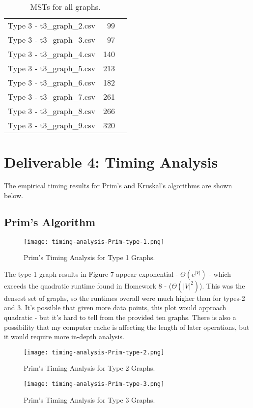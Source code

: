 \documentclass{article}
\begin{document}
\begin{table}[h!]
\begin{tabular}{lrr}
Type 3 - t3\_graph\_2.csv & 99 \\
Type 3 - t3\_graph\_3.csv & 97 \\
Type 3 - t3\_graph\_4.csv & 140 \\
Type 3 - t3\_graph\_5.csv & 213 \\
Type 3 - t3\_graph\_6.csv & 182 \\
Type 3 - t3\_graph\_7.csv & 261 \\
Type 3 - t3\_graph\_8.csv & 266 \\
Type 3 - t3\_graph\_9.csv & 320 \\
\bottomrule
\end{tabular}
\caption{MSTs for all graphs.}
\label{tab:mst_graphs}
\end{table}

\newpage
\section*{Deliverable 4: Timing Analysis}
The empirical timing results for Prim's and Kruskal's algorithms are shown below. 

\subsection*{Prim's Algorithm}

\begin{figure}[h!]
\centering
\texttt{[image: timing-analysis-Prim-type-1.png]}
\caption{Prim's Timing Analysis for Type 1 Graphs.}
\end{figure}

The type-1 graph results in Figure 7 appear exponential - $\Theta(e^{|V|})$ - which exceeds the quadratic runtime found in Homework 8 - ($\Theta(|V|^2)$). This was the densest set of graphs, so the runtimes overall were much higher than for types-2 and 3. It's possible that given more data points, this plot would approach quadratic - but it's hard to tell from the provided ten graphs. There is also a possibility that my computer cache is affecting the length of later operations, but it would require more in-depth analysis.  

\begin{figure}[h!]
\centering
\texttt{[image: timing-analysis-Prim-type-2.png]}
\caption{Prim's Timing Analysis for Type 2 Graphs.}
\end{figure}

\begin{figure}[h!]
\centering
\texttt{[image: timing-analysis-Prim-type-3.png]}
\caption{Prim's Timing Analysis for Type 3 Graphs.}
\end{figure}
\end{document}
